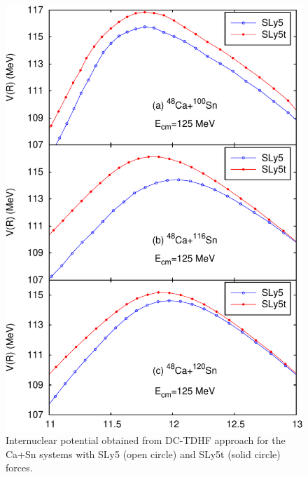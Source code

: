 \begin{figure}[t]
	\includegraphics[width=\textwidth]{../Figures/TensorPot/V4_ppt.pdf}
	\caption{Internuclear potential obtained from DC-TDHF approach for the Ca+Sn systems with SLy5 (open circle) and SLy5t (solid circle) forces.
		\label{Fig:heavy}}
\end{figure}

